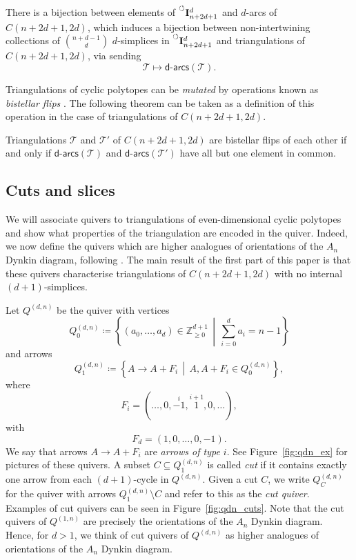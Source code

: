 \documentclass[ALCO,Unicode,published]{cedram}
\newcommand{\nonconsec}[2]{\prescript{\circlearrowleft}{}{\mathbf{I}_{#1}^{#2}}}
\newcommand{\st}{\,\middle\vert\,} %
\newcommand{\set}[1]{\left\{#1\right\}} %
\newcommand{\qdn}{Q^{(d, n)}}
\newcommand{\darcs}[1]{\mathsf{d}\text{-}\mathsf{arcs}(#1)} %
\begin{document}
\begin{theorem}
There is a bijection between elements of $\nonconsec{n + 2d + 1}{d}$ and $d$-arcs of $C(n + 2d + 1, 2d)$, which induces a bijection between non-intertwining collections of $\binom{n + d - 1}{d}$ $d$-simplices in $\nonconsec{n + 2d + 1}{d}$ and triangulations of $C(n + 2d + 1, 2d)$, via sending \[\mathcal{T} \mapsto \darcs{\mathcal{T}}.\]
\end{theorem}

Triangulations of cyclic polytopes can be \emph{mutated} by operations known as \emph{bistellar flips} \cite[Section~2.4]{lrs}. The following theorem can be taken as a definition of this operation in the case of triangulations of $C(n + 2d + 1, 2d)$.

\begin{theorem}[{\cite[Theorem~4.1]{ot}}]\label{thm:flip}
Triangulations $\mathcal{T}$ and $\mathcal{T}'$ of $C(n + 2d + 1,2d)$ are bistellar flips of each other if and only if $\darcs{\mathcal{T}}$ and $\darcs{\mathcal{T}'}$ have all but one element in common.
\end{theorem}

\subsection{Cuts and slices}\label{sect:back:cut_slice}

We will associate quivers to triangulations of even-dimensional cyclic polytopes and show what properties of the triangulation are encoded in the quiver. Indeed, we now define the quivers which are higher analogues of orientations of the $A_{n}$ Dynkin diagram, following \cite{io}. The main result of the first part of this paper is that these quivers characterise triangulations of $C(n + 2d + 1, 2d)$ with no internal $(d + 1)$-simplices.

Let $\qdn$ be the quiver with vertices \[Q_{0}^{(d,n)} \coloneqq \set{(a_{0}, \dots, a_{d}) \in \mathbb{Z}_{\geqslant 0}^{d + 1} \st \sum_{i = 0}^{d}a_{i} = n - 1}\] and arrows \[Q_{1}^{(d, n)} \coloneqq \set{A \to A + F_{i} \st A, A + F_{i} \in Q_{0}^{(d, n)}},\] where \[F_{i} = (\dots, 0, \overset{i}{-1}, \overset{i + 1}{1}, 0, \dots),\] with \[F_{d} = (1, 0, \dots, 0, -1).\] We say that arrows $A \to A + F_{i}$ are \emph{arrows of type $i$}. See Figure~\ref{fig:qdn_ex} for pictures of these quivers. A subset $C \subseteq Q_{1}^{(d, n)}$ is called \emph{cut} if it contains exactly one arrow from each $(d + 1)$-cycle in $Q^{(d, n)}$. Given a cut $C$, we write $Q_{C}^{(d, n)}$ for the quiver with arrows $Q_{1}^{(d, n)}\setminus C$ and refer to this as the \emph{cut quiver}. Examples of cut quivers can be seen in Figure~\ref{fig:qdn_cuts}. Note that the cut quivers of $Q^{(1, n)}$ are precisely the orientations of the $A_{n}$ Dynkin diagram. Hence, for $d > 1$, we think of cut quivers of $\qdn$ as higher analogues of orientations of the $A_{n}$ Dynkin diagram.
\end{document}
